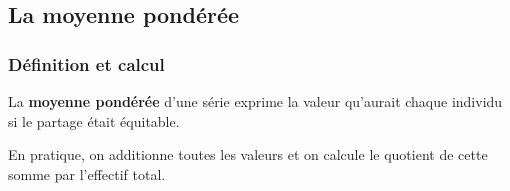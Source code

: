 \documentclass[a4paper]{book}
\begin{document}
\subsection{La moyenne pondérée}
\subsubsection{Définition et calcul}
    \begin{definition}
        La \textbf{moyenne pondérée} d'une série exprime la valeur qu'aurait chaque individu si le partage était équitable.

        \medskip

        En pratique, on additionne toutes les valeurs et on calcule le quotient de cette somme par l'effectif total.
    \end{definition}
\end{document}
